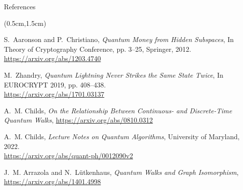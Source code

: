 \documentclass{beamer}
\theoremstyle{definition}
\begin{document}
\begin{frame}{References}
    
    \begin{textblock*}{12cm}(0.5cm,1.5cm)

        \footnotesize
        \begin{thebibliography}{99}

        S.~Aaronson and P.~Christiano,
        \newblock \emph{Quantum Money from Hidden Subspaces},
        \newblock In Theory of Cryptography Conference, pp. 3--25, Springer, 2012. \\
        \url{https://arxiv.org/abs/1203.4740}

        M.~Zhandry,
        \newblock \emph{Quantum Lightning Never Strikes the Same State Twice},
        \newblock In EUROCRYPT 2019, pp. 408--438. \\
        \url{https://arxiv.org/abs/1701.03137}

        A.~M. Childs,
        \newblock \emph{On the Relationship Between Continuous- and Discrete-Time Quantum Walks},
        \newblock \url{https://arxiv.org/abs/0810.0312}

        A.~M. Childs,
        \newblock \emph{Lecture Notes on Quantum Algorithms}, University of Maryland, 2022. \\
        \url{https://arxiv.org/abs/quant-ph/0012090v2}

        J.~M. Arrazola and N.~Lütkenhaus,
        \newblock \emph{Quantum Walks and Graph Isomorphism},
        \newblock \url{https://arxiv.org/abs/1401.4998}

        \end{thebibliography}

       

        
    \end{textblock*}
        

\end{frame}




 

\end{document}
